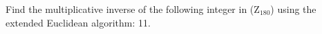 \documentclass[a4paper]{exam}
\begin{document}
\begin{questions}
\begin{solution}
        \end{solution}

        \question[5]
        Find the multiplicative inverse of the following integer in ($\text{Z}_{180}$) using the extended Euclidean algorithm: 11.


\end{questions}
\end{document}
